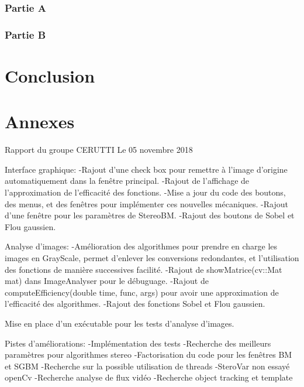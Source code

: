 \documentclass{article}
\begin{document}
\section{Partie A}

\newpage
\section{Partie B}

\newpage
\part{Conclusion}


\newpage

\appendix

\part{Annexes}

\listoffigures

\newpage
Rapport du groupe CERUTTI
Le 05 novembre 2018

Interface graphique:
	-Rajout d'une check box pour remettre à l'image d'origine automatiquement dans la fenêtre principal.
	-Rajout de l'affichage de l'approximation de l'efficacité des fonctions.
	-Mise a jour du code des boutons, des menus, et des fenêtres pour implémenter ces nouvelles mécaniques.
	-Rajout d'une fenêtre pour les paramètres de StereoBM.
	-Rajout des boutons de Sobel et Flou gaussien.
	
Analyse d'images:
	-Amélioration des algorithmes pour prendre en charge les images en GrayScale, permet d'enlever les conversions
		redondantes, et l'utilisation des fonctions de manière successives facilité.
	-Rajout de showMatrice(cv::Mat mat) dans ImageAnalyser pour le débuguage.
	-Rajout de computeEfficiency(double time, func, args) pour avoir une approximation de l'efficacité des algorithmes.
	-Rajout des fonctions Sobel et Flou gaussien.

Mise en place d'un exécutable pour les tests d'analyse d'images.

Pistes d'améliorations:
	-Implémentation des tests
	-Recherche des meilleurs paramètres pour algorithmes stereo
	-Factorisation du code pour les fenêtres BM et SGBM
	-Recherche sur la possible utilisation de threads
	-SteroVar non essayé openCv
	-Recherche analyse de flux vidéo
	-Recherche object tracking et template
\end{document}
